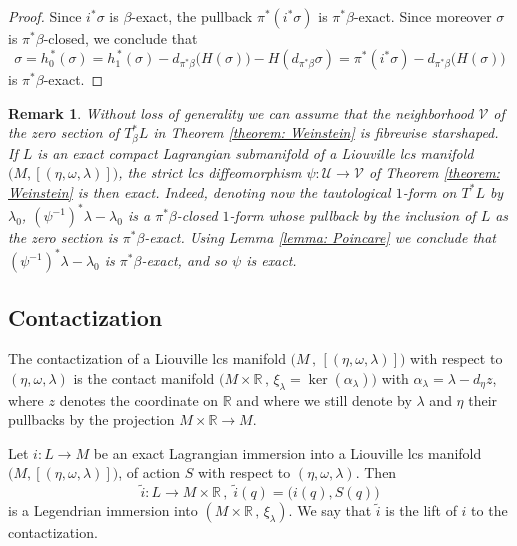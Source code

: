 \documentclass{amsart}
\newtheorem{remark}[thm]{Remark}
\theoremstyle{remark}
\begin{document}
\begin{proof}
Since $i^{\ast} \sigma$ is $\beta$-exact,
the pullback $\pi^{\ast} (i^{\ast} \sigma)$
is $\pi^{\ast}\beta$-exact.
Since moreover $\sigma$ is $\pi^{\ast}\beta$-closed,
we conclude that
$$
\sigma = h_0^{\, \ast} (\sigma)
= h_1^{\, \ast} (\sigma) - d_{\pi^{\ast}\beta} \big(H(\sigma)\big) - H (d_{\pi^{\ast}\beta}\sigma)
= \pi^{\ast} (i^{\ast} \sigma) - d_{\pi^{\ast}\beta} \big(H(\sigma)\big)
$$
is $\pi^{\ast}\beta$-exact.
\end{proof}

\begin{remark}\label{remark: exact Weinstein}
Without loss of generality
we can assume that the neighborhood $\mathcal{V}$
of the zero section of $T^{\ast}_{\beta}L$
in Theorem \ref{theorem: Weinstein} is fibrewise starshaped.
If $L$ is an exact compact Lagrangian submanifold
of a Liouville lcs manifold $\big( M, [(\eta, \omega, \lambda)] \big)$,
the strict lcs diffeomorphism $\psi: \mathcal{U} \rightarrow \mathcal{V}$
of Theorem \ref{theorem: Weinstein}
is then exact.
Indeed,
denoting now the tautological $1$-form on $T^{\ast}L$ by $\lambda_0$,
$(\psi^{-1})^{\ast}\lambda - \lambda_0$ is a $\pi^{\ast}\beta$-closed $1$-form
whose pullback by the inclusion of $L$ as the zero section
is $\pi^{\ast}\beta$-exact.
Using Lemma \ref{lemma: Poincare}
we conclude that $(\psi^{-1})^{\ast}\lambda - \lambda_0$
is $\pi^{\ast}\beta$-exact,
and so $\psi$ is exact.
\end{remark}

\subsection{Contactization}

The contactization of a Liouville lcs manifold
$\big(M \,,\, [(\eta, \omega, \lambda)]\big)$
with respect to $(\eta, \omega, \lambda)$
is the contact manifold
$\big( M \times \mathbb{R} \,,\, \xi_{\lambda} = \ker (\alpha_{\lambda}) \big)$
with $\alpha_{\lambda} = \lambda - d_{\eta}z$,
where $z$ denotes the coordinate on $\mathbb{R}$
and where we still denote by $\lambda$ and $\eta$
their pullbacks by the projection
$M \times \mathbb{R} \rightarrow M$.

Let $i: L \rightarrow M$ be an exact Lagrangian immersion
into a Liouville lcs manifold $\big(M, [(\eta, \omega, \lambda)]\big)$,
of action $S$ with respect to $(\eta, \omega,\lambda)$.
Then
\[
\widetilde{i}: L \rightarrow M \times \mathbb{R} \,,\;
\widetilde{i} (q) = \big( i(q) , S(q) \big)
\]
is a Legendrian immersion
into $(M \times \mathbb{R} \,,\, \xi_{\lambda})$.
We say that $\widetilde{i}$
is the lift of $i$
to the contactization.
\end{document}
